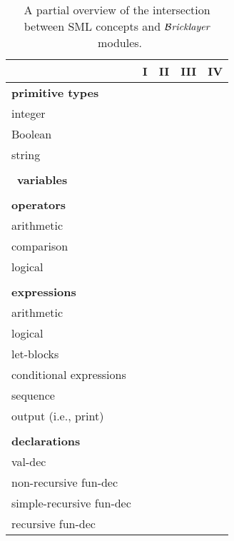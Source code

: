 \documentclass[submission,copyright,creativecommons]{eptcs}
\newcommand{\bricklayer}{\ensuremath{\mathcal{B}\emph{ricklayer}}}
\begin{document}
\begin{table*}[htb!]
\centering
\begin{tabular}{@{}lcccc@{}}\toprule
                                 & \textbf{I} & \textbf{II} & \textbf{III} & \textbf{IV} \\ \midrule
\multicolumn{5}{l}{\textbf{primitive types}} \\ \midrule
\qquad integer                   &     &      &       &      \\ \hline
\qquad Boolean                   &     &      &       &      \\ \hline
\qquad string                    &            &             &       &      \\ \hline
\multicolumn{5}{l}{} \\ \midrule
\ \textbf{variables}                        &     &      &       &      \\ \midrule
\multicolumn{5}{l}{} \\
\multicolumn{5}{l}{\textbf{operators}} \\ \midrule
\qquad arithmetic                &     &      &       &      \\ \hline
\qquad comparison                &     &      &       &      \\ \hline
\qquad logical                   &     &      &       &      \\ \hline
\multicolumn{5}{l}{} \\
\multicolumn{5}{l}{\textbf{expressions}} \\ \midrule
\qquad arithmetic                &     &      &       &      \\ \hline
\qquad logical                   &     &      &       &      \\ \hline
\qquad let-blocks                &     &      &       &      \\ \hline
\qquad conditional expressions   &            &      &       &      \\ \hline
\qquad sequence                  &            &             &       &      \\ \hline
\qquad output (i.e., print)      &            &             &       &      \\ \hline
\multicolumn{5}{l}{} \\
\multicolumn{5}{l}{\textbf{declarations}}   \\ \midrule
\qquad val-dec                   &     &      &       &      \\ \hline
\qquad non-recursive fun-dec     &     &      &       &      \\ \hline
\qquad simple-recursive fun-dec  &            &             &       &      \\ \hline
\qquad recursive fun-dec         &            &             &              &      \\
\bottomrule
\end{tabular}
\caption{A partial overview of the intersection between SML concepts and \bricklayer\ modules.}\label{table-bricklayer}
\end{table*}
\end{document}
